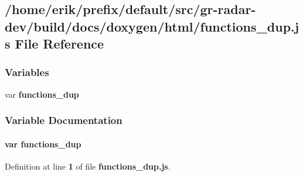 \subsection{/home/erik/prefix/default/src/gr-\/radar-\/dev/build/docs/doxygen/html/functions\+\_\+dup.js File Reference}
\label{functions__dup_8js}
\subsubsection*{Variables}
\begin{DoxyCompactItemize}
\item 
var {\bf functions\+\_\+dup}
\end{DoxyCompactItemize}


\subsubsection{Variable Documentation}
\paragraph[{functions\+\_\+dup}]{\setlength{\rightskip}{0pt plus 5cm}var functions\+\_\+dup}\label{functions__dup_8js_a8eb2e04e78e0cae8380f93a505246352}


Definition at line {\bf 1} of file {\bf functions\+\_\+dup.\+js}.

